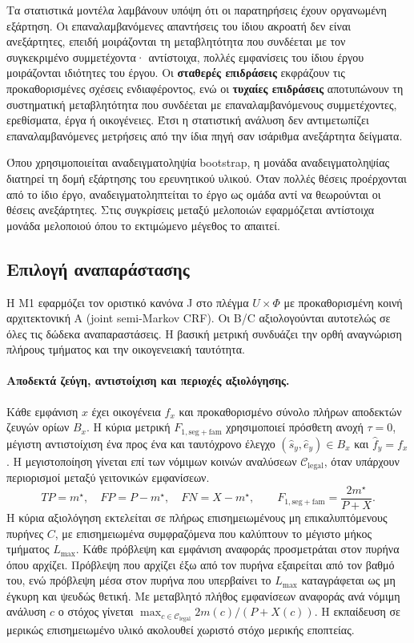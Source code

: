 \documentclass[11pt,a4paper]{article}
\begin{document}
Τα στατιστικά μοντέλα λαμβάνουν υπόψη ότι οι παρατηρήσεις έχουν οργανωμένη εξάρτηση. Οι επαναλαμβανόμενες απαντήσεις του ίδιου ακροατή δεν είναι ανεξάρτητες, επειδή μοιράζονται τη μεταβλητότητα που συνδέεται με τον συγκεκριμένο συμμετέχοντα· αντίστοιχα, πολλές εμφανίσεις του ίδιου έργου μοιράζονται ιδιότητες του έργου. Οι \textbf{σταθερές επιδράσεις} εκφράζουν τις προκαθορισμένες σχέσεις ενδιαφέροντος, ενώ οι \textbf{τυχαίες επιδράσεις} αποτυπώνουν τη συστηματική μεταβλητότητα που συνδέεται με επαναλαμβανόμενους συμμετέχοντες, ερεθίσματα, έργα ή οικογένειες. Έτσι η στατιστική ανάλυση δεν αντιμετωπίζει επαναλαμβανόμενες μετρήσεις από την ίδια πηγή σαν ισάριθμα ανεξάρτητα δείγματα.

Όπου χρησιμοποιείται αναδειγματοληψία bootstrap, η μονάδα αναδειγματοληψίας διατηρεί τη δομή εξάρτησης του ερευνητικού υλικού. Όταν πολλές θέσεις προέρχονται από το ίδιο έργο, αναδειγματοληπτείται το έργο ως ομάδα αντί να θεωρούνται οι θέσεις ανεξάρτητες. Στις συγκρίσεις μεταξύ μελοποιών εφαρμόζεται αντίστοιχα μονάδα μελοποιού όπου το εκτιμώμενο μέγεθος το απαιτεί.

\subsection{Επιλογή αναπαράστασης}\label{app:stats-selection}
Η M1 εφαρμόζει τον οριστικό κανόνα J στο πλέγμα $U\times\Phi$ με προκαθορισμένη κοινή αρχιτεκτονική A (joint semi-Markov CRF). Οι B/C αξιολογούνται αυτοτελώς σε όλες τις δώδεκα αναπαραστάσεις. Η βασική μετρική συνδυάζει την ορθή αναγνώριση πλήρους τμήματος και την οικογενειακή ταυτότητα.

\paragraph{Αποδεκτά ζεύγη, αντιστοίχιση και περιοχές αξιολόγησης.}
Κάθε εμφάνιση $x$ έχει οικογένεια $f_x$ και προκαθορισμένο σύνολο πλήρων αποδεκτών ζευγών ορίων $B_x$. Η κύρια μετρική $F_{1,\mathrm{seg+fam}}$ χρησιμοποιεί πρόσθετη ανοχή $\tau=0$, μέγιστη αντιστοίχιση ένα προς ένα και ταυτόχρονο έλεγχο $(\hat s_y,\hat e_y)\in B_x$ και $\hat f_y=f_x$. Η μεγιστοποίηση γίνεται επί των νόμιμων κοινών αναλύσεων $\mathcal C_{\mathrm{legal}}$, όταν υπάρχουν περιορισμοί μεταξύ γειτονικών εμφανίσεων.
\[
TP=m^\star,\quad FP=P-m^\star,\quad FN=X-m^\star,\qquad
F_{1,\mathrm{seg+fam}}=\frac{2m^\star}{P+X}.
\]
Η κύρια αξιολόγηση εκτελείται σε πλήρως επισημειωμένους μη επικαλυπτόμενους πυρήνες $C$, με επισημειωμένα συμφραζόμενα που καλύπτουν το μέγιστο μήκος τμήματος $L_{\max}$. Κάθε πρόβλεψη και εμφάνιση αναφοράς προσμετράται στον πυρήνα όπου αρχίζει. Πρόβλεψη που αρχίζει έξω από τον πυρήνα εξαιρείται από τον βαθμό του, ενώ πρόβλεψη μέσα στον πυρήνα που υπερβαίνει το $L_{\max}$ καταγράφεται ως μη έγκυρη και ψευδώς θετική. Με μεταβλητό πλήθος εμφανίσεων αναφοράς ανά νόμιμη ανάλυση $c$ ο στόχος γίνεται $\max_{c\in\mathcal C_{\mathrm{legal}}}2m(c)/(P+X(c))$. Η εκπαίδευση σε μερικώς επισημειωμένο υλικό ακολουθεί χωριστό στόχο μερικής εποπτείας.
\end{document}
